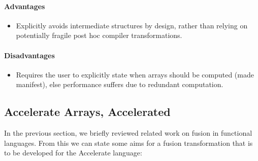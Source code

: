 \paragraph{Advantages}
\begin{itemize}
    \item Explicitly avoids intermediate structures by design, rather than
        relying on potentially fragile post hoc compiler transformations.
\end{itemize}

\paragraph{Disadvantages}
\begin{itemize}
    \item Requires the user to explicitly state when arrays should be computed
        (made manifest), else performance suffers due to redundant computation.
\end{itemize}



\subsection{Accelerate Arrays, Accelerated}

In the previous section, we briefly reviewed related work on fusion in
functional languages. From this we can state some aims for a fusion
transformation that is to be developed for the Accelerate language:

